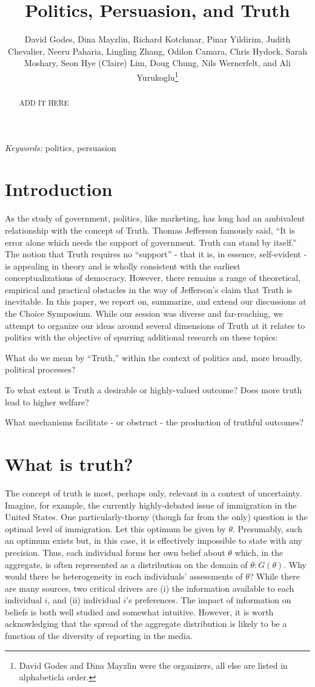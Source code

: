 \documentclass{article}
\date{}
\title{Politics, Persuasion, and Truth}
\author{David Godes, Dina Mayzlin, Richard Kotchmar, Pinar Yildirim, Judith Chevalier, Neeru Paharia, Lingling Zhang, Odilon Camara, Chris Hydock, Sarah Moshary, Seon Hye (Claire) Lim, Doug Chung, Nils Wernerfelt, and Ali Yurukoglu\footnote{David Godes and Dina Mayzlin were the organizers, all else are listed in alphabeticla order.}}
\begin{document}
\maketitle
 \begin{abstract}
ADD IT HERE 
\end{abstract}
{\it Keywords:} politics, persuasion



\begin{spacing}{2}
 \setlength{\parindent}{0.5cm}
\section{Introduction}
As the study of government, politics, like marketing, has long had an ambivalent relationship with the concept of Truth. Thomas Jefferson famously said, ``It is error alone which needs the support of government. Truth can stand by itself.'' The notion that Truth requires no ``support'' - that it is, in essence, self-evident - is appealing in theory and is wholly consistent with the earliest conceptualizations of democracy. However, there remains a range of theoretical, empirical and practical obstacles in the way of Jefferson's claim that Truth is inevitable. In this paper, we report on, summarize, and extend our discussions at the Choice Symposium. While our session was diverse and far-reaching, we attempt to organize our ideas around several dimensions of Truth at it relates to politics with the objective of spurring additional research on these topics:

What do we mean by ``Truth,'' within the context of politics and, more broadly, political processes?

To what extent is Truth a desirable or highly-valued outcome? Does more truth lead to higher welfare?

What mechanisms facilitate - or obstruct - the production of truthful outcomes?


\section{What is truth?}\label{Sec: truth_def}
The concept of truth is most, perhaps only, relevant in a context of uncertainty. Imagine, for example, the currently highly-debated issue of immigration in the United States. One particularly-thorny (though far from the only) question is the optimal level of immigration. Let this optimum be given by $\theta$. Presumably, such an optimum exists but, in this case, it is effectively impossible to state with any precision. Thus, each individual forms her own belief about $\theta$ which, in the aggregate, is often represented as a distribution on the domain of $\theta: G(\theta)$.  Why would there be heterogeneity in each individuals' assessments of $\theta$? While there are many sources, two critical drivers are (i) the information available to each individual $i$, and (ii) individual $i$'s preferences. The impact of information on beliefs is both well studied and somewhat intuitive. However, it is worth acknowledging that the spread of the aggregate distribution is likely to be a function of the diversity of reporting in the media. 


\end{spacing}
\end{document}
